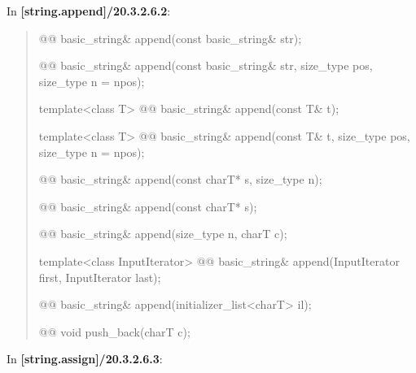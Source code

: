 \documentclass{wg21}
\begin{document}
In \textbf{[string.append]/20.3.2.6.2}:
\begin{quote}
\begin{itemdecl}
@@ basic_string& append(const basic_string& str);
\end{itemdecl}

\begin{itemdecl}
@@ basic_string& append(const basic_string& str, size_type pos, size_type n = npos);
\end{itemdecl}

\begin{itemdecl}
template<class T>
  @@ basic_string& append(const T& t);
\end{itemdecl}

\begin{itemdecl}
template<class T>
  @@ basic_string& append(const T& t, size_type pos, size_type n = npos);
\end{itemdecl}

\begin{itemdecl}
@@ basic_string& append(const charT* s, size_type n);
\end{itemdecl}

\begin{itemdecl}
@@ basic_string& append(const charT* s);
\end{itemdecl}

\begin{itemdecl}
@@ basic_string& append(size_type n, charT c);
\end{itemdecl}

\begin{itemdecl}
template<class InputIterator>
  @@ basic_string& append(InputIterator first, InputIterator last);
\end{itemdecl}

\begin{itemdecl}
@@ basic_string& append(initializer_list<charT> il);
\end{itemdecl}

\begin{itemdecl}
@@ void push_back(charT c);
\end{itemdecl}
\end{quote}


In \textbf{[string.assign]/20.3.2.6.3}:
\end{document}
